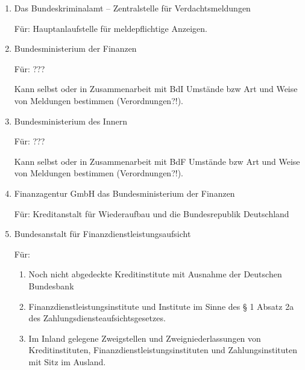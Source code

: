 \documentclass{article}
\begin{document}
            \begin{enumerate}

                \item Das Bundeskriminalamt – Zentralstelle für Verdachtsmeldungen

                    Für: Hauptanlaufstelle für meldepflichtige Anzeigen.

                \item Bundesministerium der Finanzen

                    Für: ???

                    Kann selbst oder in Zusammenarbeit mit BdI Umstände bzw Art und Weise von Meldungen bestimmen (Verordnungen?!).

                \item Bundesministerium des Innern

                    Für: ???

                    Kann selbst oder in Zusammenarbeit mit BdF Umstände bzw Art und Weise von Meldungen bestimmen (Verordnungen?!).                

                \item Finanzagentur GmbH das Bundesministerium der Finanzen

                     Für: Kreditanstalt für Wiederaufbau und die Bundesrepublik Deutschland

                \item Bundesanstalt für Finanzdienstleistungsaufsicht
                   
                    Für: 
                    \begin{enumerate}
                        \item
                            
                            Noch nicht abgedeckte Kreditinstitute mit Ausnahme der Deutschen Bundesbank

                        \item

                            Finanzdienstleistungsinstitute und Institute im Sinne des § 1 Absatz
                            2a des Zahlungsdiensteaufsichtsgesetzes.

                        \item

                            Im Inland gelegene Zweigstellen und Zweigniederlassungen von
                            Kreditinstituten, Finanzdienstleistungsinstituten und
                            Zahlungsinstituten mit Sitz im Ausland.


\end{enumerate}
\end{enumerate}
\end{document}

